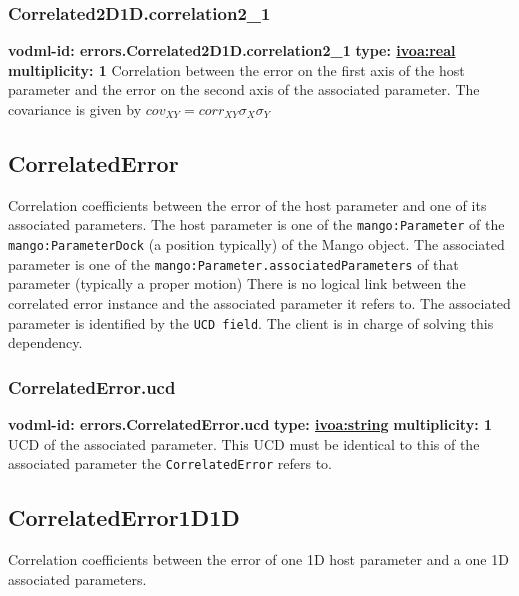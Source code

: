     \subsubsection{Correlated2D1D.correlation2\_1}
      \textbf{vodml-id: errors.Correlated2D1D.correlation2\_1} \newline
      \textbf{type: \hyperref[sect:ivoa]{ivoa:real}} \newline
      \textbf{multiplicity: 1} \newline 
      Correlation between the error on the first axis of the host parameter and the error on the second axis of the associated parameter. The covariance is given by $cov_{XY}=corr_{XY}\sigma_{X}\sigma_{Y}$

  \subsection{CorrelatedError}
  \label{sect:errors.CorrelatedError}
    Correlation coefficients between the error of the host parameter and one of its associated parameters. The host parameter is one of the \texttt{mango:Parameter} of the \texttt{mango:ParameterDock} (a position typically) of the Mango object. The associated parameter is one of the \texttt{mango:Parameter.associatedParameters} of that parameter (typically a proper motion) There is no logical link between the correlated error instance and the associated parameter it refers to. The associated parameter is identified by the \texttt{UCD field}. The client is in charge of solving this dependency.

    \subsubsection{CorrelatedError.ucd}
      \textbf{vodml-id: errors.CorrelatedError.ucd} \newline
      \textbf{type: \hyperref[sect:ivoa]{ivoa:string}} \newline
      \textbf{multiplicity: 1} \newline 
      UCD of the associated parameter. This UCD must be identical to this of the associated parameter the \texttt{CorrelatedError} refers to.

  \subsection{CorrelatedError1D1D}
  \label{sect:errors.CorrelatedError1D1D}
    Correlation coefficients between the error of one 1D host parameter and a one 1D associated parameters.

